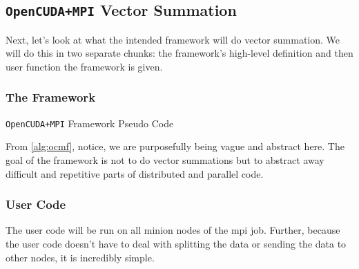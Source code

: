 \subsection{\texttt{OpenCUDA+MPI} Vector Summation}

Next, let's look at what the intended framework will do vector summation. We
will do this in two separate chunks: the framework's high-level definition and
then user function the framework is given.

\subsubsection{The Framework}

\begin{algorithm}
\begin{algorithmic}
    \EndFor{}
\EndFunction{}
\EndFunction{}
\end{algorithmic}
\caption{\texttt{OpenCUDA+MPI} Framework Pseudo Code}
\label{alg:ocmf}
\end{algorithm}

From \cref{alg:ocmf}, notice, we are purposefully being vague and abstract
here.  The goal of the framework is not to do vector summations but to abstract
away difficult and repetitive parts of distributed and parallel code.

\subsubsection{User Code}

The user code will be run on all minion nodes of the \gls{mpi} job. Further,
because the user code doesn't have to deal with splitting the data or sending
the data to other nodes, it is incredibly simple.

